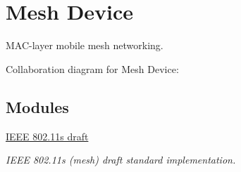 \hypertarget{group__mesh}{}\section{Mesh Device}
\label{group__mesh}


M\+A\+C-\/layer mobile mesh networking.  


Collaboration diagram for Mesh Device\+:
\subsection*{Modules}
\begin{DoxyCompactItemize}
\item 
\hyperlink{group__dot11s}{I\+E\+E\+E 802.\+11s draft}
\begin{DoxyCompactList}\small\item\em I\+E\+EE 802.\+11s (mesh) draft standard implementation. \end{DoxyCompactList}\end{DoxyCompactItemize}
